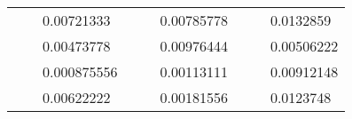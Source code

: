 \begin{table}[H]
\begin{tabular}{|cclcclccc}
\rowcolor[HTML]{DDFDFF} 
\multicolumn{1}{|c|}{\cellcolor[HTML]{FFFFC7}}                                & \multicolumn{1}{c|}{\cellcolor[HTML]{DDFDFF}}                      & \multicolumn{1}{l|}{\cellcolor[HTML]{DAE8FC}0.00721333}  & \multicolumn{1}{c|}{\cellcolor[HTML]{FFFFC7}}                                & \multicolumn{1}{c|}{\cellcolor[HTML]{DDFDFF}}                       & \multicolumn{1}{l|}{\cellcolor[HTML]{DDFDFF}0.00785778}  & \multicolumn{1}{c|}{\cellcolor[HTML]{FFFFC7}}                                & \multicolumn{1}{c|}{\cellcolor[HTML]{DDFDFF}}                      & \multicolumn{1}{l|}{\cellcolor[HTML]{DDFDFF}0.0132859}   \\ \cline{3-3} \cline{6-6} \cline{9-9} 
\multicolumn{1}{|c|}{\cellcolor[HTML]{FFFFC7}}                                & \multicolumn{1}{c|}{\cellcolor[HTML]{DDFDFF}}                      & \multicolumn{1}{l|}{\cellcolor[HTML]{DDFDFF}0.00473778}  & \multicolumn{1}{c|}{\cellcolor[HTML]{FFFFC7}}                                & \multicolumn{1}{c|}{\cellcolor[HTML]{DDFDFF}}                       & \multicolumn{1}{l|}{\cellcolor[HTML]{DAE8FC}0.00976444}  & \multicolumn{1}{c|}{\cellcolor[HTML]{FFFFC7}}                                & \multicolumn{1}{c|}{\cellcolor[HTML]{DDFDFF}}                      & \multicolumn{1}{l|}{\cellcolor[HTML]{DAE8FC}0.00506222}  \\ \cline{3-3} \cline{6-6} \cline{9-9} 
\rowcolor[HTML]{DDFDFF} 
\multicolumn{1}{|c|}{\cellcolor[HTML]{FFFFC7}}                                & \multicolumn{1}{c|}{\cellcolor[HTML]{DDFDFF}}                      & \multicolumn{1}{l|}{\cellcolor[HTML]{DAE8FC}0.000875556} & \multicolumn{1}{c|}{\cellcolor[HTML]{FFFFC7}}                                & \multicolumn{1}{c|}{\cellcolor[HTML]{DDFDFF}}                       & \multicolumn{1}{l|}{\cellcolor[HTML]{DDFDFF}0.00113111}  & \multicolumn{1}{c|}{\cellcolor[HTML]{FFFFC7}}                                & \multicolumn{1}{c|}{\cellcolor[HTML]{DDFDFF}}                      & \multicolumn{1}{l|}{\cellcolor[HTML]{DDFDFF}0.00912148}  \\ \cline{3-3} \cline{6-6} \cline{9-9} 
\multicolumn{1}{|c|}{\cellcolor[HTML]{FFFFC7}}                                & \multicolumn{1}{c|}{\cellcolor[HTML]{DDFDFF}}                      & \multicolumn{1}{l|}{\cellcolor[HTML]{DDFDFF}0.00622222}  & \multicolumn{1}{c|}{\cellcolor[HTML]{FFFFC7}}                                & \multicolumn{1}{c|}{\cellcolor[HTML]{DDFDFF}}                       & \multicolumn{1}{l|}{\cellcolor[HTML]{DAE8FC}0.00181556}  & \multicolumn{1}{c|}{\cellcolor[HTML]{FFFFC7}}                                & \multicolumn{1}{c|}{\cellcolor[HTML]{DDFDFF}}                      & \multicolumn{1}{l|}{\cellcolor[HTML]{DAE8FC}0.0123748}   \\ \cline{3-3} \cline{6-6} \cline{9-9} 

\end{tabular}
\end{table}
